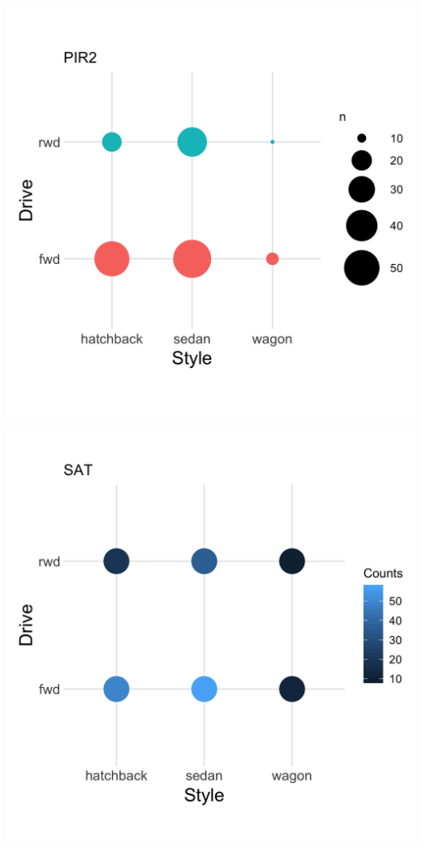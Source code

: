 \documentclass[]{article}
\newcommand{\setwidth}{0.40\textwidth}
\begin{document}
\noindent\hrulefill

\hspace*{\fill}
\begin{minipage}{\setwidth}
  \centering
  \includegraphics[width=1.00\textwidth]{../images/05_area}
\end{minipage} %
\hfill\vline\hfill
\begin{minipage}{\setwidth}
  \centering
  \includegraphics[width=1.00\textwidth]{../images/06_sat}
\end{minipage}
\hspace*{\fill}
\end{document}

